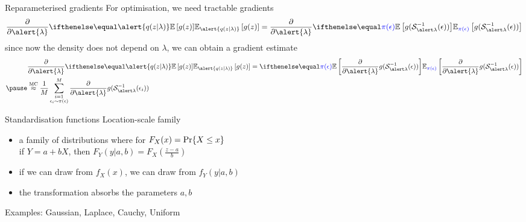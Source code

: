 \documentclass[14pt,dvipsnames]{beamer}
\begin{document}
\begin{frame}{Reparameterised gradients}
	For optimisation, we need tractable gradients
	\begin{equation*}
		\begin{aligned}
			\pdv{\alert{\lambda}}  \E[\alert{q(z|\lambda)}]{g(z)} = \pdv{\alert{\lambda}} \E[\textcolor{blue}{\pi(\epsilon)}]{g(\inv{\mathcal S}_{\alert\lambda}(\epsilon)) }
		\end{aligned}
	\end{equation*} \pause
	since now the density does not depend on $\lambda$, we can obtain a gradient estimate
	\begin{equation*}
		\begin{aligned}
			&\pdv{\alert{\lambda}}  \E[\alert{q(z|\lambda)}]{g(z)} =  \E[\textcolor{blue}{\pi(\epsilon)}]{\pdv{\alert{\lambda}} g(\inv{\mathcal S}_{\alert\lambda}(\epsilon)) } \\ \pause
			&\overset{\text{MC}}{\approx}  \frac{1}{M} \sum_{\substack{i=1\\ \epsilon_i \sim \pi(\epsilon)}}^M \pdv{\alert{\lambda}} g(\inv{\mathcal S}_{\alert\lambda}(\epsilon_i)) 
		\end{aligned}
	\end{equation*}
\end{frame}

\begin{frame}{Standardisation functions}
	Location-scale family
	\begin{itemize}
		\item a family of distributions where for $F_X(x) = \operatorname{Pr}\{X \le x\}$ \\
		if $Y=a + b X$, then  $F_Y(y|a, b)=F_X(\frac{z-a}{b})$ \pause
		\item if we can draw from $f_X(x)$, we can draw from $f_Y(y|a,b)$ \pause
		\item the transformation absorbs the parameters $a, b$
	\end{itemize}
	
	\pause
	
	Examples: Gaussian, Laplace, Cauchy, Uniform
	
\end{frame}
\end{document}
